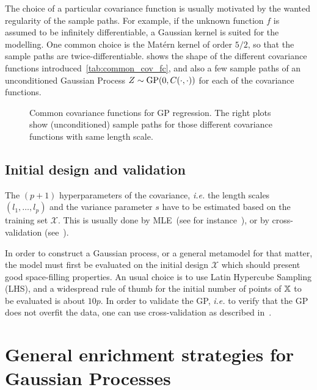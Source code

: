 \documentclass[../../Main_ManuscritThese.tex]{subfiles}
\newcommand\imgpath{/home/victor/acadwriting/Manuscrit/Text/Chapter4/img/}
\begin{document}
  The choice of a particular covariance function is usually motivated
  by the wanted regularity of the sample paths. For example, if the
  unknown function $f$ is assumed to be infinitely differentiable, a
  Gaussian kernel is suited for the modelling. One common choice is
  the Matérn kernel of order $5/2$, so that the sample paths are
  twice-differentiable.  shows the shape of
  the different covariance functions
  introduced~\cref{tab:common_cov_fc}, and also a few sample paths of
  an unconditioned Gaussian Process $Z\sim\operatorname{\mathrm{GP}}(0, C(\cdot, \cdot))$ for
  each of the covariance functions.
  
\begin{figure}[ht]
  \centering
  
  \caption[Common covariance functions for GP]{\label{fig:cov_fc_examples} Common covariance functions for GP regression. The right plots show (unconditioned) sample paths for those different covariance functions with same length scale.}
\end{figure}

\subsection{Initial design and validation}

The $(p + 1)$ hyperparameters of the covariance, \textit{i.e.} the
length scales $(l_1,\dots,l_{p})$ and the variance parameter $s$ have
to be estimated based on the training set $\mathcal{X}$. This is
usually done by MLE~(see for instance~\cite{ribaud_robustness_2019}),
or by cross-validation (see~\cite{ginsbourger_note_2009}).

In order to construct a Gaussian process, or a general metamodel for
that matter, the model must first be evaluated on the initial design
$\mathcal{X}$ which should present good space-filling properties. An
usual choice is to use Latin Hypercube Sampling (LHS), and a
widespread rule of thumb for the initial number of points of $\mathbb{X}$
to be evaluated is about $10p$. In order to validate the GP,
\emph{i.e.} to verify that the GP does not overfit the data, one can
use cross-validation as described in~\cite{dubrule_cross_1983}.


\section{General enrichment strategies for Gaussian Processes}
\label{sec:enrichment_strategies}
\end{document}
